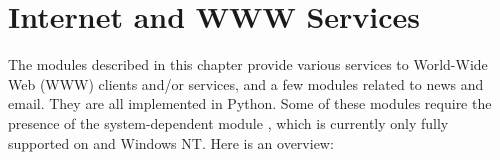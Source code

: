\chapter{Internet and WWW Services}
\label{www}

The modules described in this chapter provide various services to
World-Wide Web (WWW) clients and/or services, and a few modules
related to news and email.  They are all implemented in Python.  Some
of these modules require the presence of the system-dependent module
, which is currently only fully
supported on \UNIX{} and Windows NT.  Here is an overview:

\localmoduletable
